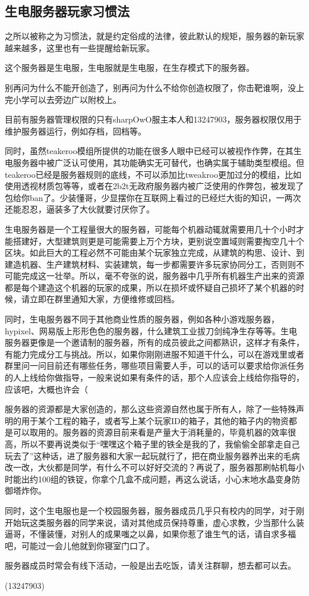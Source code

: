 \documentclass[UTF8,a4paper]{article}
\begin{document}
		\subsection{生电服务器玩家习惯法}
			\par 之所以被称之为习惯法，就是约定俗成的法律，彼此默认的规矩，服务器的新玩家越来越多，这里也有一些提醒给新玩家。
			\par 这个服务器是生电服，生电服就是生电服，在生存模式下的服务器。
			\par 别再问为什么不能开创造了，别再问为什么不给你创造权限了，你击靶谁啊，没上完小学可以去旁边广以附校上。
			\par 目前有服务器管理权限的只有sharpOwO服主本人和13247903，服务器权限仅用于维护服务器运行，例如存档，回档等。
			\par 同时，虽然teakeroo模组所提供的功能在很多人眼中已经可以被视作作弊，在其生电服务器中被广泛认可使用，其功能确实无可替代，也确实属于辅助类型模组。但teakeroo已经是服务器规则的底线，不可以添加比tweakroo更加过分的模组，比如使用透视材质包等等，或者在2b2t无政府服务器内被广泛使用的作弊包，被发现了包给你ban了。少装懂哥，少显摆你在互联网上看过的已经烂大街的知识，一两次还能忍忍，逼装多了大伙就要讨厌你了。
			\par 生电服务器是一个工程量很大的服务器，可能每个机器动辄就需要用几十个小时才能搭建好，大型建筑则更是可能需要上万个方块，更别说空置域则需要掏空几十个区块。如此巨大的工程必然不可能由某个玩家独立完成，从建筑的构思、设计、到建造机器、生产建筑材料、实装建筑，每一步都需要许多玩家协同分工，否则则不可能完成这一壮举。所以，毫不夸张的说，服务器中几乎所有机器生产出来的资源都是每个建造这个机器的玩家的成果，所以在损坏或怀疑自己损坏了某个机器的时候，请立即在群里通知大家，方便维修或回档。
			\par 同时，生电服务器不同于其他商业性质的服务器，例如各种小游戏服务器，hypixel、网易版上形形色色的服务器，什么建筑工业拔刀剑纯净生存等等。生电服务器更像是一个邀请制的服务器，所有的成员彼此之间都熟识，这样才有条件，有能力完成分工与挑战。所以，如果你刚刚进服不知道干什么，可以在游戏里或者群里问一问目前还有哪些任务，哪些项目需要人手，可以的话可以要求给你派任务的人上线给你做指导，一般来说如果有条件的话，那个人应该会上线给你指导的，应该吧，大概也许会（
			\par 服务器的资源都是大家创造的，那么这些资源自然也属于所有人，除了一些特殊声明的用于某个工程的箱子，或者写上某个玩家ID的箱子，其他的箱子内的物资都是可以取用的。服务器的资源目前来看是产量大于消耗量的，毕竟机器的效率很高，所以不要再说类似于“嘿嘿这个箱子里的铁全是我的了，我偷偷全部拿走自己玩去了”这种话，进了服务器和大家一起玩就行了，把在商业服务器养出来的毛病改一改，大伙都是同学，有什么不可以好好交流的？再说了，服务器那刷帖机每小时能出约100组的铁锭，你拿个几盒不成问题，再这么说话，小心末地水晶变身防御塔炸你。
			\par 同时，这个生电服也是一个校园服务器，服务器成员几乎只有校内的同学，对于刚开始玩这类服务器的同学来说，请对其他成员保持尊重，虚心求教，少当那什么装逼哥，不懂装懂，对别人的成果嗤之以鼻，如果你惹了谁生气的话，请自求多福吧，可能过一会儿他就到你寝室门口了。
			\par 服务器成员时常会有线下活动，一般是出去吃饭，请关注群聊，想去都可以去。
			\begin{flushright}(13247903)\end{flushright}
\end{document}

